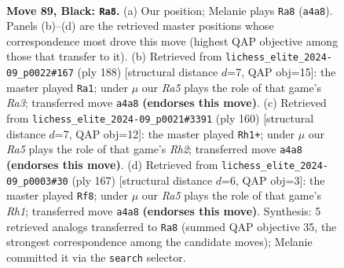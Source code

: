 \documentclass[11pt]{article}
\begin{document}
\begin{figure}[p]\centering
\begin{subfigure}{0.46\textwidth}\centering
\resizebox{\linewidth}{!}{%
\newchessgame
\chessboard[
  setfen={8/2k5/8/1R4K1/r6P/3r4/8/8 b - - 20 89},
  showmover=false,
  pgfstyle=straightmove, color=movearrow, markmove={a4-a8}
]}
\caption{}
\end{subfigure}\hfill
\begin{subfigure}{0.46\textwidth}\centering
\resizebox{\linewidth}{!}{%
\newchessgame
\chessboard[
  setfen={8/8/8/8/8/R3p1K1/2rk4/8 w - - 16 95},
  showmover=false,
  pgfstyle=straightmove, color=movearrow, markmove={a3-a1}
]}
\caption{}
\end{subfigure}
\\[4pt]
\begin{subfigure}{0.46\textwidth}\centering
\resizebox{\linewidth}{!}{%
\newchessgame
\chessboard[
  setfen={8/8/8/4r3/8/8/1K2p2R/3k4 w - - 6 81},
  showmover=false,
  pgfstyle=straightmove, color=movearrow, markmove={h2-h1}
]}
\caption{}
\end{subfigure}\hfill
\begin{subfigure}{0.46\textwidth}\centering
\resizebox{\linewidth}{!}{%
\newchessgame
\chessboard[
  setfen={7r/3K2R1/1kP5/8/8/8/8/8 b - - 12 84},
  showmover=false,
  pgfstyle=straightmove, color=movearrow, markmove={h8-f8}
]}
\caption{}
\end{subfigure}
\caption{\textbf{Move 89, Black: \texttt{Ra8}.} (a) Our position; Melanie plays \texttt{Ra8} (\texttt{a4a8}). Panels (b)--(d) are the retrieved master positions whose correspondence most drove this move (highest QAP objective among those that transfer to it). (b) Retrieved from \texttt{lichess\_elite\_2024-09\_p0022\#167} (ply 188) [structural distance $d$=7, QAP obj=15]: the master played \texttt{Ra1}; under $\mu$ our \emph{Ra5} plays the role of that game's \emph{Ra3}; transferred move \texttt{a4a8} \textbf{(endorses this move)}. (c) Retrieved from \texttt{lichess\_elite\_2024-09\_p0021\#3391} (ply 160) [structural distance $d$=7, QAP obj=12]: the master played \texttt{Rh1+}; under $\mu$ our \emph{Ra5} plays the role of that game's \emph{Rh2}; transferred move \texttt{a4a8} \textbf{(endorses this move)}. (d) Retrieved from \texttt{lichess\_elite\_2024-09\_p0003\#30} (ply 167) [structural distance $d$=6, QAP obj=3]: the master played \texttt{Rf8}; under $\mu$ our \emph{Ra5} plays the role of that game's \emph{Rh1}; transferred move \texttt{a4a8} \textbf{(endorses this move)}. Synthesis: 5 retrieved analogs transferred to \texttt{Ra8} (summed QAP objective 35, the strongest correspondence among the candidate moves); Melanie committed it via the \texttt{search} selector.}
\label{fig:thought-m177}
\end{figure}
\end{document}
